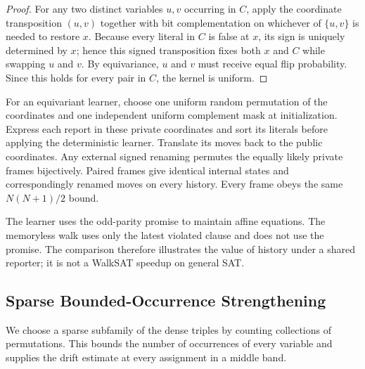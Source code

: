 \documentclass[11pt,a4paper]{article}
\theoremstyle{definition}
\theoremstyle{remark}
\begin{document}
\begin{proof}
For any two distinct variables $u, v$ occurring in $C$, apply the coordinate transposition $(u,v)$ together with bit complementation on whichever of $\{u,v\}$ is needed to restore $x$. Because every literal in $C$ is false at $x$, its sign is uniquely determined by $x$; hence this signed transposition fixes both $x$ and $C$ while swapping $u$ and $v$. By equivariance, $u$ and $v$ must receive equal flip probability. Since this holds for every pair in $C$, the kernel is uniform.
\end{proof}

For an equivariant learner, choose one uniform random permutation of the coordinates and one independent uniform complement mask at initialization. Express each report in these private coordinates and sort its literals before applying the deterministic learner. Translate its moves back to the public coordinates. Any external signed renaming permutes the equally likely private frames bijectively. Paired frames give identical internal states and correspondingly renamed moves on every history. Every frame obeys the same $N(N+1)/2$ bound.

The learner uses the odd-parity promise to maintain affine equations. The memoryless walk uses only the latest violated clause and does not use the promise. The comparison therefore illustrates the value of history under a shared reporter; it is not a WalkSAT speedup on general SAT.

\subsection{Sparse Bounded-Occurrence Strengthening}

We choose a sparse subfamily of the dense triples by counting collections of permutations. This bounds the number of occurrences of every variable and supplies the drift estimate at every assignment in a middle band.
\end{document}
